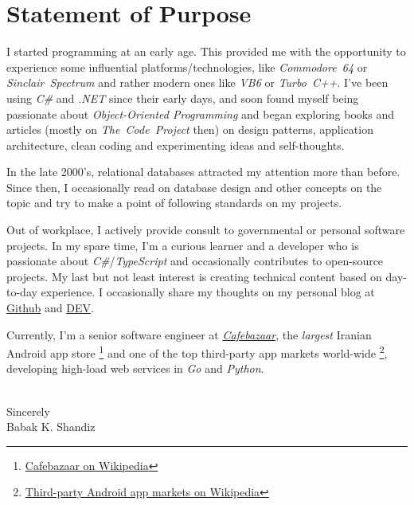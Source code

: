 \documentclass[10pt,a4paper]{article}
\begin{document}


\section*{Statement of Purpose}

I started programming at an early age. This provided me with the opportunity
to experience some influential platforms/technologies, like
\textit{Commodore~64} or \textit{Sinclair~Spectrum} and rather modern ones
like \textit{VB6} or \textit{Turbo~C++}. I've been using \textit{C\#} and
\textit{.NET} since their early days, and soon found myself being passionate
about \textit{Object-Oriented Programming} and began exploring books and
articles (mostly on \textit{The~Code~Project} then) on design patterns,
application architecture, clean coding and experimenting ideas and
self-thoughts.

In the late 2000's, relational databases attracted my attention more than
before. Since then, I occasionally read on database design and other
concepts on the topic and try to make a point of following standards on my
projects.

Out of workplace, I actively provide consult to governmental or personal
software projects. In my spare time, I'm a curious learner and a developer who
is passionate about \textit{C\#}/\textit{TypeScript} and occasionally
contributes to open-source projects. My last but not least interest is
creating technical content based on day-to-day experience. I
occasionally share my thoughts on my personal blog at
\href{https://babakks.github.io}{Github} and
\href{https://dev.to/babakks}{DEV}.

Currently, I'm a senior software engineer at
\href{https://cafebazaar.ir}{\emph{Cafebazaar}}, the \textit{largest}
Iranian Android app store%
\footnote{\label{cb-on-wiki}%
    \href{https://en.wikipedia.org/wiki/Cafe\_Bazaar}{Cafebazaar on Wikipedia}}%
and one of the top third-party app markets world-wide%
\footnote{\label{3rd-party-stores-on-wiki}%
    \href{https://en.wikipedia.org/wiki/List\_of\_mobile\_app\_distribution\_platforms\#Third-party\_platforms}%
    {Third-party Android app markets on Wikipedia}},
developing high-load web services in \textit{Go} and \textit{Python}.

\\
\noindent
Sincerely \\
\noindent
Babak K. Shandiz
\end{document}
